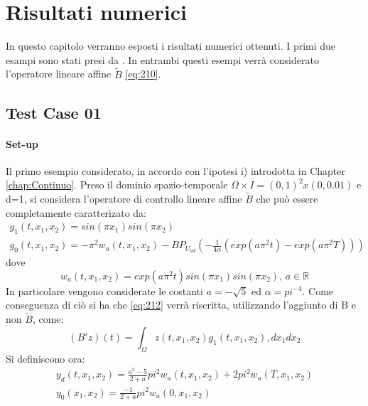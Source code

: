 \chapter{Risultati numerici}
\label{chap:Results}
In questo capitolo verranno esposti i risultati numerici ottenuti.
I primi due esampi sono stati presi da \cite{MAIN}.
In entrambi questi esempi verrà considerato l'operatore lineare affine $\tilde{B}$ \ref{eq:210}.

\section{Test Case 01}
\subsubsection{Set-up}
Il primo esempio considerato, in accordo con l'ipotesi i) introdotta in Chapter \ref{chap:Continuo}.
Preso il dominio spazio-temporale $\Omega \times I = (0,1)^2 x(0,0.01)$ e d=1, si considera l'operatore di controllo lineare affine $\tilde{B}$ che può essere completamente caratterizato da:
{\renewcommand\arraystretch{2}
\begin{equation}
\begin{array}{c}
g_1(t,x_1,x_2) = sin({\pi}x_1)sin({\pi}x_2)\\
g_0(t,x_1,x_2) = -{\pi}^2w_a(t,x_1,x_2) - BP_{U_{ad}} \left( -\frac{1}{4\alpha}(exp(a{\pi}^2t)-exp(a{\pi}^2T)) \right)
\end{array}
\label{eq:500}
\end{equation}
}
dove
\begin{equation}
w_a(t,x_1,x_2) = exp(a{\pi}^2t)sin({\pi}x_1)sin({\pi}x_2) \text{, } a \in \mathbb{R}
\label{eq:501}
\end{equation}
In particolare vengono considerate le costanti $a=-\sqrt{5}$ ed $\alpha={pi}^{-4}$.
Come conseguenza di ciò si ha che \ref{eq:212} verrà riscritta, utilizzando l'aggiunto di B e non $\tilde{B}$, come:
\begin{equation}
(B'z)(t) = \int_{\Omega} z(t,x_1,x_2)g_1(t,x_1,x_2) ,dx_1dx_2
\label{eq:502}
\end{equation}
Si definiscono ora:
{\renewcommand\arraystretch{2}
\begin{equation}
\begin{array}{c}
y_d(t,x_1,x_2) = \frac{a^2 - 5}{2 + a}{pi}^2w_a(t,x_1,x_2) + 2{pi}^2w_a(T,x_1,x_2) \\
y_0(x_1,x_2) = \frac{- 1}{2 + a}{pi}^2w_a(0,x_1,x_2)
\end{array}
\label{eq:503}
\end{equation}
}
